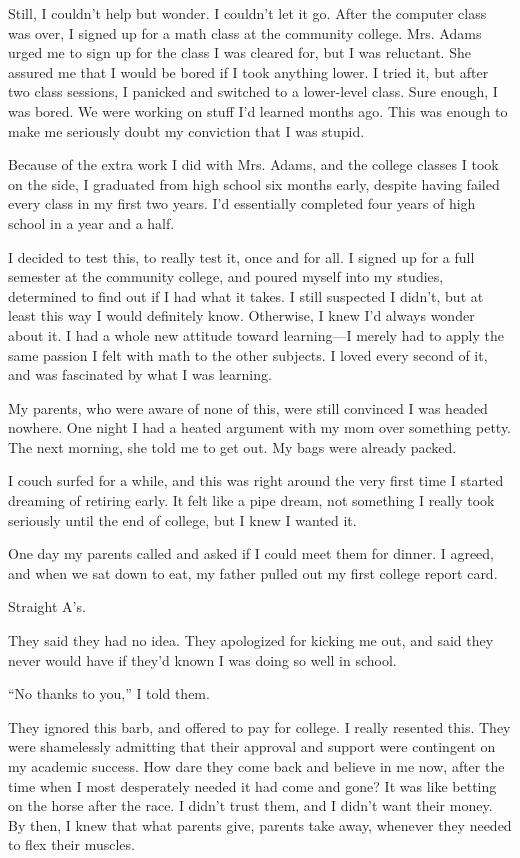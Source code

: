 Still, I couldn't help but wonder. I couldn't let it go. After the computer class was over, I signed up for a math class at the community college. Mrs. Adams urged me to sign up for the class I was cleared for, but I was reluctant. She assured me that I would be bored if I took anything lower. I tried it, but after two class sessions, I panicked and switched to a lower-level class. Sure enough, I was bored. We were working on stuff I'd learned months ago. This was enough to make me seriously doubt my conviction that I was stupid.

Because of the extra work I did with Mrs. Adams, and the college classes I took on the side, I graduated from high school six months early, despite having failed every class in my first two years. I'd essentially completed four years of high school in a year and a half.

I decided to test this, to really test it, once and for all. I signed up for a full semester at the community college, and poured myself into my studies, determined to find out if I had what it takes. I still suspected I didn't, but at least this way I would definitely know. Otherwise, I knew I'd always wonder about it. I had a whole new attitude toward learning---I merely had to apply the same passion I felt with math to the other subjects. I loved every second of it, and was fascinated by what I was learning.

My parents, who were aware of none of this, were still convinced I was headed nowhere. One night I had a heated argument with my mom over something petty. The next morning, she told me to get out. My bags were already packed.

I couch surfed for a while, and this was right around the very first time I started dreaming of retiring early. It felt like a pipe dream, not something I really took seriously until the end of college, but I knew I wanted it.

One day my parents called and asked if I could meet them for dinner. I agreed, and when we sat down to eat, my father pulled out my first college report card.

Straight A's.

They said they had no idea. They apologized for kicking me out, and said they never would have if they'd known I was doing so well in school.

``No thanks to you,'' I told them.

They ignored this barb, and offered to pay for college. I really resented this. They were shamelessly admitting that their approval and support were contingent on my academic success. How dare they come back and believe in me now, after the time when I most desperately needed it had come and gone? It was like betting on the horse after the race. I didn't trust them, and I didn't want their money. By then, I knew that what parents give, parents take away, whenever they needed to flex their muscles.


